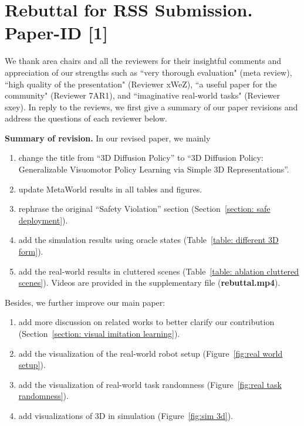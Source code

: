 
\section*{\textbf{Rebuttal for RSS Submission. Paper-ID [1]}}

We thank area chairs and all the reviewers for their insightful comments and appreciation of our strengths such as ``very thorough evaluation" (meta review), ``high quality of the presentation" (Reviewer xWeZ), ``a useful paper for the community" (Reviewer 7AR1), and ``imaginative real-world tasks" (Reviewer sxey). In reply to the reviews, we first give a summary of our paper revisions and address the questions of each reviewer below.

\noindent\textbf{Summary of revision.} In our revised paper, we mainly
\begin{enumerate}
    \item 
change the title from “3D Diffusion Policy” to “3D Diffusion Policy: Generalizable Visuomotor Policy Learning via Simple 3D Representations”.

\item update MetaWorld results in all tables and figures.

\item rephrase the original “Safety Violation” section (Section~\ref{section: safe deployment}).


\item  add the simulation results using oracle states (Table~\ref{table: different 3D form}).

\item add the real-world results in cluttered scenes (Table~\ref{table: ablation cluttered scenes}). Videos are provided in the supplementary file (\textbf{rebuttal.mp4}).

\end{enumerate}
Besides, we further improve our main paper:
\begin{enumerate}
\item add more discussion on related works to better clarify our contribution (Section~\ref{section: visual imitation learning}).
\item add the visualization of the real-world robot setup (Figure~\ref{fig:real world setup}).
\item add the visualization of real-world task randomness (Figure~\ref{fig:real task randomness}).

\item  add visualizations of 3D in simulation (Figure~\ref{fig:sim 3d}).
\end{enumerate}




